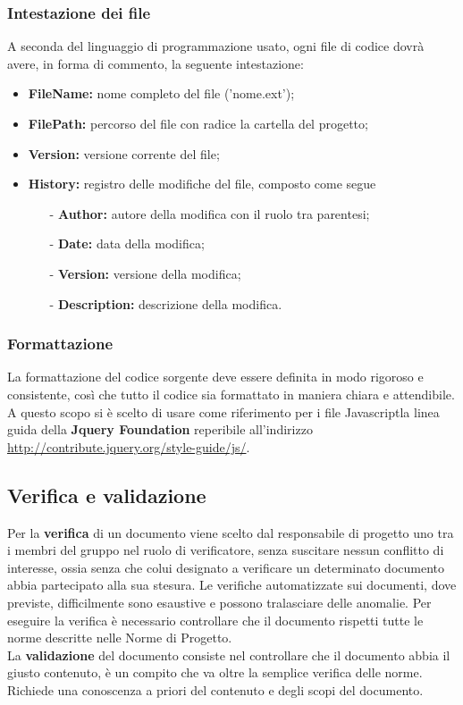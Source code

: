 \documentclass[a4paper,11pt]{article}
\begin{document}
			\subsubsection{Intestazione dei file}		
			A seconda del linguaggio di programmazione usato, ogni file di codice dovrà avere, in forma di commento, la seguente intestazione:		
			
		\begin{itemize}
		\item \textbf{FileName:} nome completo del file ('nome.ext');
		\item \textbf{FilePath:} percorso del file con radice la cartella del progetto;
		\item \textbf{Version:} versione corrente del file;
		\item \textbf{History:} registro delle modifiche del file, composto come segue 
			\begin{itemize}
			\item[-] \textbf{Author:} autore della modifica con il ruolo tra parentesi;
			\item[-] \textbf{Date:} data della modifica;
			\item[-] \textbf{Version:} versione della modifica;
			\item[-] \textbf{Description:} descrizione della modifica.
			\end{itemize}	
		\end{itemize}
		
		\subsubsection{Formattazione}
		La formattazione del codice sorgente deve essere definita in modo rigoroso e consistente, così
che tutto il codice sia formattato in maniera chiara e attendibile. A questo scopo si è scelto di usare come riferimento per i file Javascript\addglos  la linea guida della \textbf{Jquery Foundation} reperibile all'indirizzo \url{http://contribute.jquery.org/style-guide/js/}.
	\subsection{Verifica e validazione}
	Per la \textbf{verifica} di un documento viene scelto dal responsabile di progetto uno tra i membri del gruppo nel ruolo di verificatore, senza suscitare nessun conflitto di interesse, ossia senza che colui designato a verificare un determinato documento abbia partecipato alla sua stesura.
	 Le verifiche automatizzate sui documenti, dove previste, difficilmente sono esaustive e possono tralasciare delle anomalie. Per eseguire la verifica è necessario controllare che il documento rispetti tutte le norme descritte nelle Norme di Progetto. \\
	La \textbf{validazione} del documento consiste nel controllare che il documento abbia il giusto contenuto, è un compito che va oltre la semplice verifica delle norme. Richiede una conoscenza a priori del contenuto e degli scopi del documento.
\end{document}
